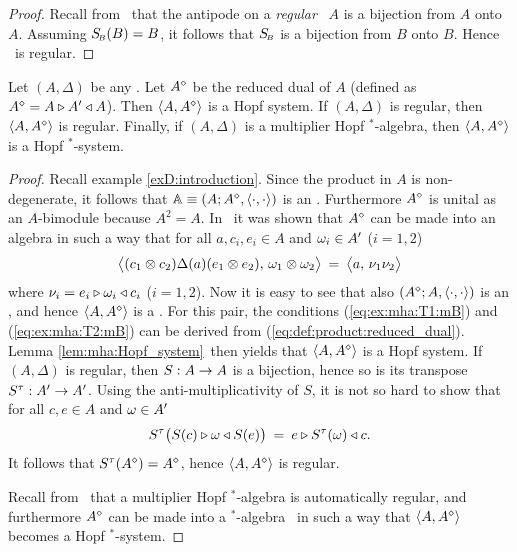 \begin{proof}
Recall from \cite{Fons:MHA}\ that the antipode on a {\em regular\/} \mha\ $A$
is a bijection from $A$ onto $A$. Assuming $S_{\scriptscriptstyle \! B}(B)=B$, it follows that
$S_{\scriptscriptstyle \! B}$ is a bijection from $B$ onto $B$. Hence \ is regular.
\end{proof}




\begin{prop}
Let\/ $(A,\Delta)$ be any \mha\@. Let $A^\diamond$ be the reduced dual of $A$
(defined as $A^\diamond = A\triangleright A' \triangleleft A$).
Then $\langle A,A^\diamond \rangle$ is a Hopf system.
If\/ $(A,\Delta)$ is regular, then $\langle A,A^\diamond \rangle$ is regular.
Finally, if\/ $(A,\Delta)$ is a multiplier Hopf $^*$-algebra, then
$\langle A,A^\diamond \rangle$ is a Hopf $^*$-system.
\end{prop}
\begin{proof}
Recall example \ref{exD:introduction}\@. Since the product in $A$ is non-degenerate,
it follows that $\mathbb{A}\equiv (A;A^\diamond,\langle\cdot, \cdot\rangle)$ is an \context\@.
Furthermore $A^\diamond$ is unital as an $A$-bimodule because $A^2=A$.
In \cite[\S 6]{Fons:MHA}\ it was shown that $A^\diamond$ can be made into an algebra
in such a way that for all $a,c_i, e_i \in A$ and $\omega_i \in A'$ ($i=1,2$)
\begin{equation}\label{eq:def:product:reduced_dual}
   \pairM{(c_1 \tens c_2)\Delta(a)(e_1 \tens e_2)}{\om_1 \tens \om_2}
      \:=\:  \pairM{a}{\nu_1 \nu_2}
\end{equation}
where $\nu_i = e_i \triangleright \omega_i \triangleleft c_i$ ($i=1,2$).
Now it is easy to see that also $(A^\diamond;A,\langle\cdot, \cdot\rangle)$ is an \context,
and hence $\langle A,A^\diamond \rangle$ is a \dpa\@.
For this pair, the conditions (\ref{eq:ex:mha:T1:mB}) and (\ref{eq:ex:mha:T2:mB})
can be derived from (\ref{eq:def:product:reduced_dual}).
Lemma \ref{lem:mha:Hopf_system}\ then yields that $\langle A,A^\diamond \rangle$ is a Hopf system.
If\/ $(A,\Delta)$ is regular, then $S: A\rightarrow A$ is a bijection,
hence so is its transpose $S^{\tau}: A'\rightarrow A'$. Using the anti-multiplicativity of $S$,
it is not so hard to show that for all $c,e \in A$ and $\omega \in A'$
$$  S^{\tau} \! \left( S(c) \lact \om \ract S(e)  \vertM\right)
    \:=\:  e \lact S^{\tau}(\om) \ract c. $$
It follows that $S^{\tau}(A^\diamond) = A^\diamond$,
hence $\langle A,A^\diamond \rangle$ is regular.

Recall from \cite{Fons:MHA}\ that a multiplier Hopf $^*$-algebra is automatically regular,
and furthermore $A^\diamond$ can be made into a $^*$-algebra \cite[proposition 6.6]{Fons:MHA}\
in such a way that $\langle A,A^\diamond \rangle$ becomes a Hopf $^*$-system.
\end{proof}


